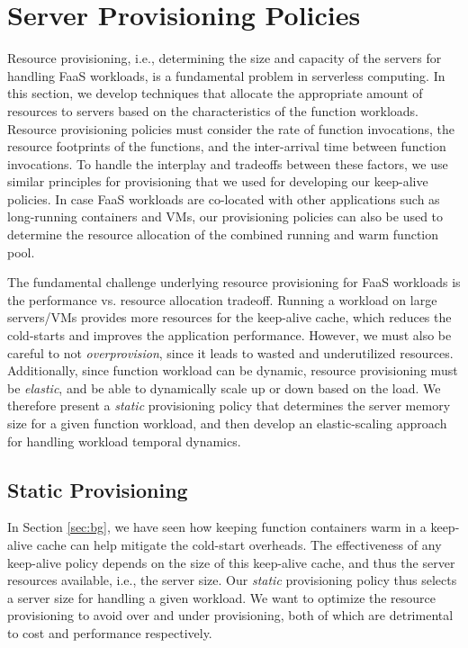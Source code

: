 \section{Server Provisioning Policies} %
\label{sec:provision}

Resource provisioning, i.e., determining the size and capacity of the servers for handling FaaS workloads, is a fundamental problem in serverless computing. 
In this section, we develop techniques that allocate the appropriate amount of resources to servers based on the characteristics of the function workloads. 
Resource provisioning policies must consider the rate of function invocations, the resource footprints of the functions, and the inter-arrival time between function invocations. 
To handle the interplay and tradeoffs between these factors, we use similar principles for provisioning that we used for developing our keep-alive policies. 
In case FaaS workloads are co-located with other applications such as long-running containers and VMs, our provisioning policies can also be used to determine the resource allocation of the combined running and warm function pool. 

The fundamental challenge underlying resource provisioning for FaaS workloads is the performance vs. resource allocation tradeoff. 
Running a workload on large servers/VMs provides more resources for the keep-alive cache, which reduces the cold-starts and improves the application performance. 
However, we must also be careful to not \emph{overprovision}, since it leads to wasted and underutilized resources.
Additionally, since function workload can be dynamic, resource provisioning must be \emph{elastic}, and be able to dynamically scale up or down based on the load. 
We therefore present a \emph{static} provisioning policy that determines the server memory size for a given function workload, and then develop an elastic-scaling approach for handling workload temporal dynamics. 

\subsection{Static Provisioning}
\label{subsec:static}

In Section \ref{sec:bg}, we have seen how keeping function containers warm in a keep-alive cache can help mitigate the cold-start overheads. 
The effectiveness of any keep-alive policy depends on the size of this keep-alive cache, and thus the server resources available, i.e., the server size. 
Our \emph{static} provisioning policy thus selects a server size for handling a given workload. 
We want to optimize the resource provisioning to avoid over and under provisioning, both of which are detrimental to cost and performance respectively. 


